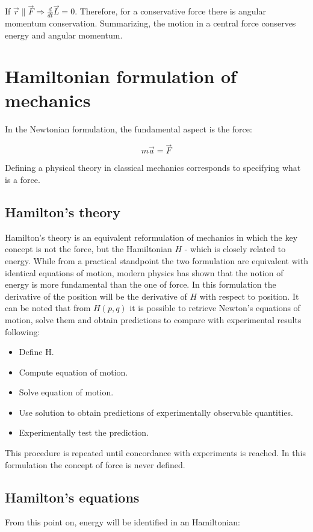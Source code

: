   If $\vec{r}\parallel \vec{F}\Rightarrow \frac{d{}}{d{t}}\vec{L} = 0$.
  Therefore, for a conservative force there is angular momentum conservation.
  Summarizing, the motion in a central force conserves energy and angular momentum.

\section{Hamiltonian formulation of mechanics}
In the Newtonian formulation, the fundamental aspect is the force:

$$m \vec{a} = \vec{F}$$

Defining a physical theory in classical mechanics corresponds to specifying what is a force.

  \subsection{Hamilton's theory}
  Hamilton's theory is an equivalent reformulation of mechanics in which the key concept is not the force, but the Hamiltonian $H$ - which is closely related to energy.
  While from a practical standpoint the two formulation are equivalent with identical equations of motion, modern physics has shown that the notion of energy is more fundamental than the one of force.
  In this formulation the derivative of the position will be the derivative of $H$ with respect to position.
  It can be noted that from $H(p,q)$ it is possible to retrieve Newton's equations of motion, solve them and obtain predictions to compare with experimental results following:

  \begin{multicols}{2}
    \begin{itemize}
        \item Define H.
        \item Compute equation of motion.
        \item Solve equation of motion.
        \item Use solution to obtain predictions of experimentally observable quantities.
        \item Experimentally test the prediction.
    \end{itemize}
  \end{multicols}

  This procedure is repeated until concordance with experiments is reached.
  In this formulation the concept of force is never defined.

  \subsection{Hamilton's equations}
  From this point on, energy will be identified in an Hamiltonian:

